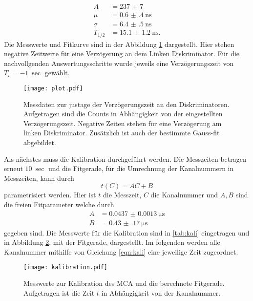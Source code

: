 \begin{align*}
    A &= \num{237(7)} \\
    \mu &= \SI{0.6(4)}{\nano\second} \\
    \sigma &= \SI{6.4(5)}{\nano\second} \\
    T_{1/2} &= \SI{15.1(12)}{\nano\second}.
\end{align*}
Die Messwerte und Fitkurve sind in der Abbildung \ref{fig:Verzögerung} dargestellt. Hier stehen negative Zeitwerte für eine Verzögerung an dem Linken Diskriminator. 
Für die nachvollgenden Auswertungsschritte wurde jeweils eine Verzögerungszeit von $T_v = \SI{-1}{\sec}$ gewählt.
\begin{figure}
    \centering
    \texttt{[image: plot.pdf]}
    \caption{Messdaten zur justage der Verzögerungszeit an den Diskriminatoren. Aufgetragen sind die Counts in Abhängigkeit von der eingestellten Verzögerungszeit. Negative Zeiten stehen für eine Verzögerung am linken Diskriminator. Zusätzlich ist auch der bestimmte Gauss-fit abgebildet.   }
    \label{fig:Verzögerung}
\end{figure} 
Als nächstes muss die Kalibration durchgeführt werden. Die Messzeiten betragen erneut $\SI{10}{\sec}$ und die Fitgerade, für die Umrechnung der Kanalnummern in Messzeiten, kann durch 
\begin{equation}
    \label{eqn:kali}
    t(C) = AC + B
\end{equation}
parametrisiert werden. Hier ist $t$ die Messzeit, $C$ die Kanalnummer und $A,B$ sind die freien Fitparameter welche durch
\begin{align*}
    A &= \SI{0.0437(13)}{\micro\second} \\
    B &= \SI{0.43(17)}{\micro\second}
\end{align*}
gegeben sind. Die Messwerte für die Kalibration sind in \ref{tab:kali} eingetragen und in Abbildung \ref{fig:kali}, mit der Fitgerade, dargestellt.
Im folgenden werden alle Kanalnummer mithilfe von Gleichung \ref{eqn:kali} eine jeweilige Zeit zugeordnet.
\begin{figure}
    \centering
    \texttt{[image: kalibration.pdf]}
    \caption{ Messwerte zur Kalibration des MCA und die berechnete Fitgerade. Aufgetragen ist die Zeit $t$ in Abhängigkeit von der Kanalnummer.}
    \label{fig:kali}
\end{figure}
